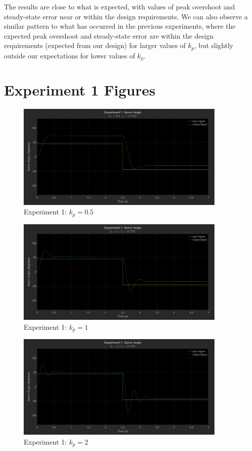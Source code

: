 \documentclass[12pt]{article}
\begin{document}
The results are close to what is expected, with values of peak overshoot and steady-state error near or within the design requirements. We can also observe a similar pattern to what has occurred in the previous experiments, where the expected peak overshoot and steady-state error are within the design requirements (expected from our design) for larger values of $k_p$, but slightly outside our expectations for lower values of $k_p$.

\clearpage
\appendix
\section{Experiment 1 Figures} \label{appendix:exp1fig}
\begin{figure}[h]
    \centering
    \includegraphics[width=0.91\textwidth]{exp1_kp0.5}
    \caption{Experiment 1: $k_p = 0.5$}
\end{figure}
\begin{figure}[h]
    \centering
    \includegraphics[width=0.91\textwidth]{exp1_kp1}
    \caption{Experiment 1: $k_p = 1$}
\end{figure}
\begin{figure}[h]
    \centering
    \includegraphics[width=0.91\textwidth]{exp1_kp2}
    \caption{Experiment 1: $k_p = 2$}
\end{figure}
\end{document}
